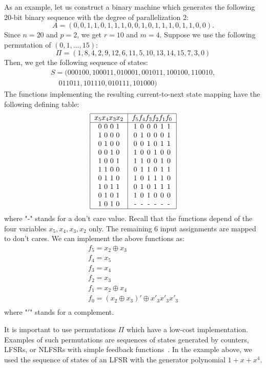 \documentclass[10pt,conference]{IEEEtran}
\begin{document}
As an example, let us construct a binary machine 
which generates the following 20-bit binary sequence with the degree of parallelization 2:
\[
A = (0,0,1,1,0,1,1,1,0,0,1,0,1,1,1,0,1,1,0,0).
\]
Since $n = 20$ and $p = 2$, we get
$r = 10$ and $m = 4$. Suppose we use the following permutation
of $(0,1,\ldots,15)$:
\[
\Pi = (1, 8, 4, 2, 9, 12, 6, 11, 5, 10, 13, 14, 15, 7, 3, 0)
\]
Then, we get the following sequence of states:
\[
\begin{array}{l}
S = (000100, 100011, 010001, 001011, 100100, 110010, \\
~~~~~ 011011, 101110, 010111, 101000) 
\end{array}
\]
The functions implementing the resulting 
current-to-next state mapping have the following defining table:
\[
\begin{tabular}{|c|c@{}c@{}c@{}c@{}c@{}c|} \hline
$x_5 x_4 x_3 x_2$ & $f_5$ & $f_4$ & $f_3$ & $f_2$ & $f_1$ & $f_0$  \\ \hline
0~0~0~1 & 1&0&0&0&1&1 \\
1~0~0~0 & 0&1&0&0&0&1 \\
0~1~0~0 & 0&0&1&0&1&1 \\
0~0~1~0 & 1&0&0&1&0&0 \\
1~0~0~1 & 1&1&0&0&1&0 \\
1~1~0~0 & 0&1&1&0&1&1 \\
0~1~1~0 & 1&0&1&1&1&0 \\
1~0~1~1 & 0&1&0&1&1&1 \\
0~1~0~1 & 1&0&1&0&0&0 \\
1~0~1~0 & -&-&-&-&-&- \\ \hline
\end{tabular}
\]
where "-" stands for a don't care value.
Recall that the functions depend of the four variables $x_5, x_4, x_3, x_2$ only.
The remaining 6 input assignments are mapped to don't cares.
We can implement the above functions as:
\[
\begin{array}{l}
f_5 = x_2 \oplus x_3\\
f_4 = x_5\\
f_3 = x_4\\
f_2 = x_3\\
f_1 = x_2 \oplus x_4\\
f_0 = (x_2 \oplus x_3)' \oplus x'_3 x'_3 x'_3\\
\end{array}
\]
where "$'$" stands for a complement.

It is important to use permutations $\Pi$ which have a low-cost implementation.
Examples of such permutations are sequences of states generated by counters, LFSRs, or NLFSRs with simple feedback functions~\cite{Du12}. In the example above, we used the sequence of states of an LFSR with the generator polynomial $1+x+x^4$.
\end{document}
